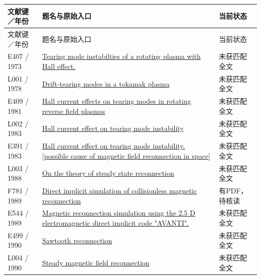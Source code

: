 \small\begin{longtable}{P{24mm}P{97mm}P{27mm}}

\toprule 文献键／年份 & 题名与原始入口 & 当前状态\\\midrule\endfirsthead

\toprule 文献键／年份 & 题名与原始入口 & 当前状态\\\midrule\endhead

E407 / 1973 & \href{http://www.osti.gov/scitech/biblio/4575517-tearing-mode-instabilties-rotating-plasma-hall-effect}{Tearing mode instabilties of a rotating plasma with Hall effect.} & 未获匹配全文\\

L001 / 1978 & \href{https://doi.org/10.1088/0029-5515/18/8/003}{Drift-tearing modes in a tokamak plasma} & 未获匹配全文\\

E409 / 1981 & \href{https://doi.org/10.1017/s0022377800022996}{Hall current effects on tearing modes in rotating reverse field plasmas} & 未获匹配全文\\

L002 / 1983 & \href{https://doi.org/10.1029/gl010i006p00475}{Hall current effect on tearing mode instability} & 未获匹配全文\\

E391 / 1983 & \href{https://ntrs.nasa.gov/search.jsp?R=19830053518}{Hall current effect on tearing mode instability. [possible cause of magnetic field reconnection in space]} & 未获匹配全文\\

L003 / 1988 & \href{https://doi.org/10.1016/0010-4655(88)90222-6}{On the theory of steady state reconnection} & 未获匹配全文\\

F781 / 1989 & \href{https://www.osti.gov/servlets/purl/7161998}{Direct implicit simulation of collisionless magnetic reconnection} & 有PDF，待核读\\

E544 / 1989 & \href{https://ui.adsabs.harvard.edu/abs/1989ESASP.285...55H/abstract}{Magnetic reconnection simulation using the 2.5 D electromagnetic direct implicit code "AVANTI".} & 未获匹配全文\\

E499 / 1990 & \href{https://doi.org/10.1088/0029-5515/30/12/008}{Sawtooth reconnection} & 未获匹配全文\\

L004 / 1990 & \href{https://doi.org/10.1029/gm058p0063}{Steady magnetic field reconnection} & 未获匹配全文\\


\end{longtable}
